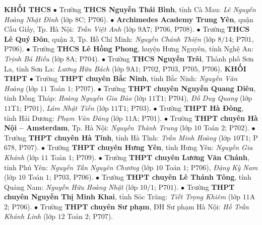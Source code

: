 \begin{multicols}{2}
	\textbf{\color{thachthuctoanhoc}KHỐI THCS}
	\vskip 0.05cm
	$\bullet$  Trường \textbf{\color{thachthuctoanhoc}THCS Nguyễn Thái Bình}, tỉnh Cà Mau: \textit{Lê Nguyễn Hoàng Nhật Đình} (lớp $8$C; P$706$).
	\vskip 0.05cm
	$\bullet$  \textbf{\color{thachthuctoanhoc}Archimedes Academy Trung Yên}, quận Cầu Giấy, Tp. Hà Nội: \textit{Trần Việt Anh} (lớp $9$A$7$; P$706$, P$708$).
	\vskip 0.05cm
	$\bullet$  Trường \textbf{\color{thachthuctoanhoc}THCS Lê Quý Đôn}, quận $3$, Tp. Hồ Chí Minh: \textit{Nguyễn Chánh Thiện} (lớp $8/14$; P$701$, P$706$).
	\vskip 0.05cm
	$\bullet$  Trường \textbf{\color{thachthuctoanhoc}THCS Lê Hồng Phong}, huyện Hưng Nguyên, tỉnh Nghệ An: \textit{Trịnh Bá Hiếu} (lớp $8$A; P$704$).
	\vskip 0.05cm
	$\bullet$  Trường \textbf{\color{thachthuctoanhoc}THCS Nguyễn Trãi}, Thành phố Sơn La, tỉnh Sơn La: \textit{Lương Hữu Bách} (lớp $9$A$1$; P$702$, P$703$, P$705$, P$706$).
	\vskip 0.05cm
	\textbf{\color{thachthuctoanhoc}KHỐI THPT}
	\vskip 0.05cm
	$\bullet$  Trường \textbf{\color{thachthuctoanhoc}THPT chuyên Bắc Ninh}, tỉnh Bắc Ninh: \textit{Nguyễn Văn Hoàng} (lớp $11$ Toán $1$; P$707$).
	\vskip 0.05cm
	$\bullet$  Trường \textbf{\color{thachthuctoanhoc}THPT chuyên Nguyễn Quang Diêu}, tỉnh Đồng Tháp: \textit{Hoàng Nguyễn Gia Bảo} (lớp $11$T$1$; P$704$), \textit{Đỗ Duy Quang} (lớp $11$T$1$; P$701$), \textit{Lâm Nhật Tiến} (lớp $11$T$1$; P$703$).
	\vskip 0.05cm
	$\bullet$  Trường \textbf{\color{thachthuctoanhoc}THPT Hà Đông}, tỉnh Hải Dương: \textit{Phạm Văn Đăng} (lớp $11$A; P$701$).
	\vskip 0.05cm
	$\bullet$  Trường \textbf{\color{thachthuctoanhoc}THPT chuyên Hà Nội -- Amsterdam}, Tp. Hà Nội: \textit{Nguyễn Thành Trung} (lớp $10$ Toán $2$; P$702$).
	\vskip 0.05cm
	$\bullet$  Trường \textbf{\color{thachthuctoanhoc}THPT chuyên Hà Tĩnh}, tỉnh Hà Tĩnh: \textit{Trần Minh Hoàng} (lớp $10$T$1$; P$678$, P$707$).
	\vskip 0.05cm
	$\bullet$  Trường \textbf{\color{thachthuctoanhoc}THPT chuyên Hưng Yên}, tỉnh Hưng Yên: \textit{Nguyễn Gia Khánh} (lớp $11$ Toán $1$; P$709$).
	\vskip 0.05cm
	$\bullet$  Trường \textbf{\color{thachthuctoanhoc}THPT chuyên Lương Văn Chánh}, tỉnh Phú Yên: \textit{Nguyễn Tấn Nguyên Chương} (lớp $10$ Toán $1$; P$706$), \textit{Đặng Kỳ Nam} (lớp $10$ Toán $1$; P$703$, P$706$).
	\vskip 0.05cm
	$\bullet$  Trường \textbf{\color{thachthuctoanhoc}THPT chuyên Lê Thánh Tông}, tỉnh Quảng Nam: \textit{Nguyễn Hữu Hoàng Nhật} (lớp $10/1$; P$701$).
	\vskip 0.05cm
	$\bullet$  Trường \textbf{\color{thachthuctoanhoc}THPT chuyên Nguyễn Thị Minh Khai}, tỉnh Sóc Trăng: \textit{Tiết Trọng Khiêm} (lớp $11$A$2$; P$706$).
	\vskip 0.05cm
	$\bullet$  Trường \textbf{\color{thachthuctoanhoc}THPT chuyên Sư phạm}, ĐH Sư phạm Hà Nội: \textit{Hồ Trần Khánh Linh} (lớp $12$ Toán $2$; P$707$).
\end{multicols}
